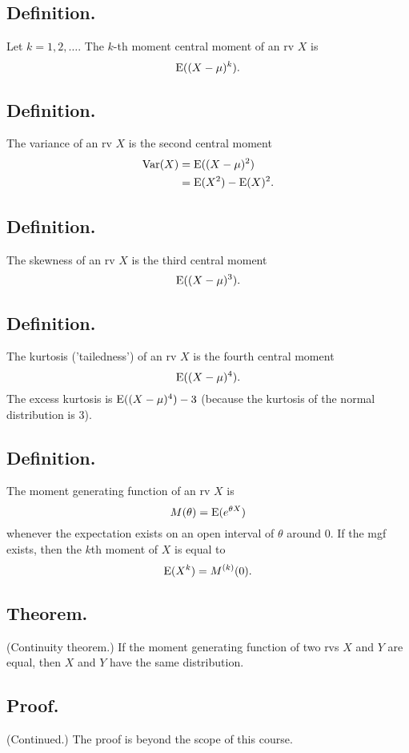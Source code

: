 \documentclass[titlepage]{article}
\begin{document}
\subsection{Definition.} Let $k = 1, 2, \ldots$. The $k$-th moment central moment of an rv $X$ is 
$$\text{E}((X-\mu)^{k}).$$

\subsection{Definition.} The variance of an rv $X$ is the second central moment 
\begin{align*}
    \text{Var}(X) &= \text{E}((X-\mu)^{2}) \\
            &= \text{E}(X^{2}) - \text{E}(X)^{2}.
\end{align*}

\subsection{Definition.} The skewness of an rv $X$ is the third central moment 
$$\text{E}((X-\mu)^{3}).$$

\subsection{Definition.} The kurtosis ('tailedness') of an rv $X$ is the fourth central moment 
$$\text{E}((X-\mu)^{4}).$$
The excess kurtosis is $\text{E}((X-\mu)^{4}) - 3$ (because the kurtosis of the normal distribution is $3$).

\subsection{Definition.} The moment generating function of an rv $X$ is 
$$M(\theta) = \text{E}(e^{\theta X})$$
whenever the expectation exists on an open interval of $\theta$ around $0$. If the mgf exists, then the $k$th moment of $X$ is equal to 
$$\text{E}(X^{k}) = M^{(k)}(0).$$

\subsection{Theorem.} (Continuity theorem.) If the moment generating function of two rvs $X$ and $Y$ are equal, then $X$ and $Y$ have the same distribution.

\subsection{Proof.} (Continued.) The proof is beyond the scope of this course.
\end{document}
